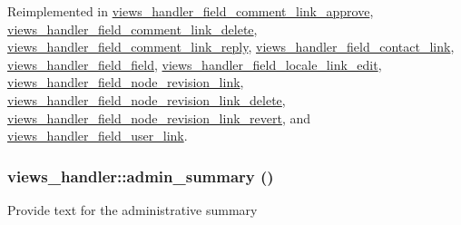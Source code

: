 Reimplemented in \hyperlink{classviews__handler__field__comment__link__approve_aa6f8bce989b5c5dacce1d2390263a59a}{views\_\-handler\_\-field\_\-comment\_\-link\_\-approve}, \hyperlink{classviews__handler__field__comment__link__delete_ad37af388e723047cc0f727d471ca6efb}{views\_\-handler\_\-field\_\-comment\_\-link\_\-delete}, \hyperlink{classviews__handler__field__comment__link__reply_a62a569f6e9af558f67bedfabde5cef55}{views\_\-handler\_\-field\_\-comment\_\-link\_\-reply}, \hyperlink{classviews__handler__field__contact__link_a5785d1771c75ad924557c3df87d6288b}{views\_\-handler\_\-field\_\-contact\_\-link}, \hyperlink{classviews__handler__field__field_adf074793dec71e06e0512d16415ff91b}{views\_\-handler\_\-field\_\-field}, \hyperlink{classviews__handler__field__locale__link__edit_aef9bc33a9c15cd4a9b6958445762a703}{views\_\-handler\_\-field\_\-locale\_\-link\_\-edit}, \hyperlink{classviews__handler__field__node__revision__link_a29923ca97bbff1c87c0e9338ec972a07}{views\_\-handler\_\-field\_\-node\_\-revision\_\-link}, \hyperlink{classviews__handler__field__node__revision__link__delete_a8d1e660c4945e837ced26d6f12a6521e}{views\_\-handler\_\-field\_\-node\_\-revision\_\-link\_\-delete}, \hyperlink{classviews__handler__field__node__revision__link__revert_a6cb6e683478e55b9e3e64602dbc8886d}{views\_\-handler\_\-field\_\-node\_\-revision\_\-link\_\-revert}, and \hyperlink{classviews__handler__field__user__link_a00708207b597556c70cba91816a03963}{views\_\-handler\_\-field\_\-user\_\-link}.\hypertarget{classviews__handler_a27a5cb35f3f17322957730a95b6be11e}{
\subsubsection[{admin\_\-summary}]{\setlength{\rightskip}{0pt plus 5cm}views\_\-handler::admin\_\-summary ()}}
\label{classviews__handler_a27a5cb35f3f17322957730a95b6be11e}
Provide text for the administrative summary 

